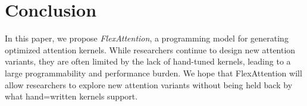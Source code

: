 \section{Conclusion}
In this paper, we propose \textit{FlexAttention}, a programming model for generating optimized attention kernels.
While researchers continue to design new attention variants, they are often limited by the lack of hand-tuned kernels, leading to a large programmability and performance burden.
We hope that FlexAttention will allow researchers to explore new attention variants without being held back by what hand=written kernels support.










